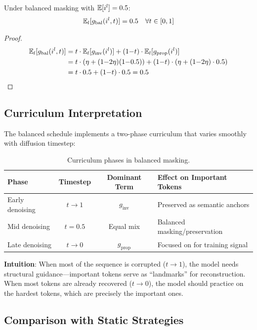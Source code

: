 \begin{proposition}
Under balanced masking with $\mathbb{E}[i^l] = 0.5$:
\begin{equation}
    \mathbb{E}_l[g_{\text{bal}}(i^l, t)] = 0.5 \quad \forall t \in [0,1]
\end{equation}
\end{proposition}

\begin{proof}
\begin{align}
    \mathbb{E}_l[g_{\text{bal}}(i^l, t)] &= t \cdot \mathbb{E}_l[g_{\text{inv}}(i^l)] + (1{-}t) \cdot \mathbb{E}_l[g_{\text{prop}}(i^l)] \\
    &= t \cdot (\eta + (1{-}2\eta)(1{-}0.5)) + (1{-}t) \cdot (\eta + (1{-}2\eta) \cdot 0.5) \\
    &= t \cdot 0.5 + (1{-}t) \cdot 0.5 = 0.5 \qedhere
\end{align}
\end{proof}

\subsection{Curriculum Interpretation}

The balanced schedule implements a two-phase curriculum that varies smoothly with diffusion timestep:

\begin{table}[h]
\centering
\caption{Curriculum phases in balanced masking.}
\begin{tabular}{lccl}
\toprule
\textbf{Phase} & \textbf{Timestep} & \textbf{Dominant Term} & \textbf{Effect on Important Tokens} \\
\midrule
Early denoising & $t \to 1$ & $g_{\text{inv}}$ & Preserved as semantic anchors \\
Mid denoising & $t = 0.5$ & Equal mix & Balanced masking/preservation \\
Late denoising & $t \to 0$ & $g_{\text{prop}}$ & Focused on for training signal \\
\bottomrule
\end{tabular}
\end{table}

\textbf{Intuition}: When most of the sequence is corrupted ($t \to 1$), the model needs structural guidance---important tokens serve as ``landmarks'' for reconstruction. When most tokens are already recovered ($t \to 0$), the model should practice on the hardest tokens, which are precisely the important ones.

\subsection{Comparison with Static Strategies}

